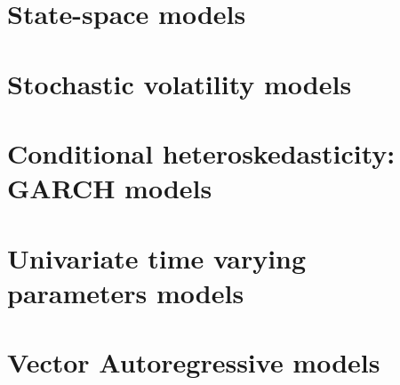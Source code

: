 \section{State-space models}

\section{Stochastic volatility models}



\section{Conditional heteroskedasticity: GARCH models}\label{sec82}

\section{Univariate time varying parameters models}\label{sec83}

\section{Vector Autoregressive models}\label{sec84}
